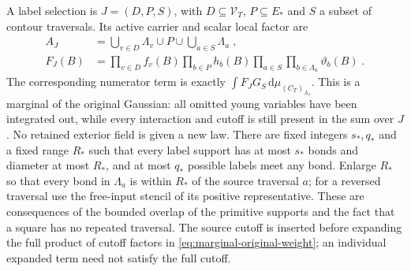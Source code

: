 \documentclass[11pt]{article}
\newcommand{\dd}{\mathrm{d}}
\begin{document}
A label selection is $J=(D,P,S)$, with $D\subseteq \mathcal V_T$, $P\subseteq E_*$ and $S$ a subset of contour traversals. Its active carrier and scalar local factor are
\begin{equation}\label{eq:marginal-selection}
    \begin{aligned}
        A_J&=\bigcup_{v\in D}\Lambda_v\cup P
            \cup\bigcup_{a\in S}\Lambda_a\;,\\
        F_J(B)&=\prod_{v\in D}f_v(B)\prod_{b\in P}h_b(B)
            \prod_{a\in S}\prod_{b\in \Lambda_a}\vartheta_b(B)\;.
    \end{aligned}
\end{equation}
The corresponding numerator term is exactly $\int F_JG_S\,\dd\mu_{(C_T)_{A_J}}$. This is a marginal of the original Gaussian: all omitted young variables have been integrated out, while every interaction and cutoff is still present in the sum over $J$. No retained exterior field is given a new law. There are fixed integers $s_*,q_*$ and a fixed range $R_*$ such that every label support has at most $s_*$ bonds and diameter at most $R_*$, and at most $q_*$ possible labels meet any bond. Enlarge $R_*$ so that every bond in $\Lambda_a$ is within $R_*$ of the source traversal $a$; for a reversed traversal use the free-input stencil of its positive representative. These are consequences of the bounded overlap of the primitive supports and the fact that a square has no repeated traversal. The source cutoff is inserted before expanding the full product of cutoff factors in \eqref{eq:marginal-original-weight}; an individual expanded term need not satisfy the full cutoff.
\end{document}
